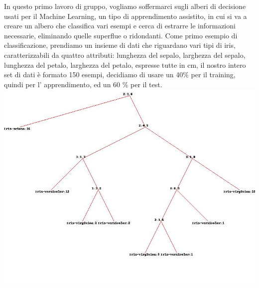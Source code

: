 		In questo primo lavoro di gruppo, vogliamo soffermarci sugli alberi di decisione usati per il Machine Learning, un tipo di apprendimento assistito, in cui si va a creare un albero che classifica vari esempi e cerca di estrarre le informazioni necessarie, eliminando quelle superflue o ridondanti.
		\newline
		Come primo esempio di classificazione, prendiamo un insieme di dati che riguardano vari tipi di iris, caratterizzabili da quattro attributi: lunghezza del sepalo, larghezza del sepalo, lunghezza del petalo, larghezza del petalo, espresse tutte in cm,  il nostro intero set di dati è formato 150 esempi, decidiamo di usare un 
		40\% per il training, quindi per l' apprendimento, ed un 60 \% per il test.
		\includegraphics[scale=0.37]{iris.jpg}
		
